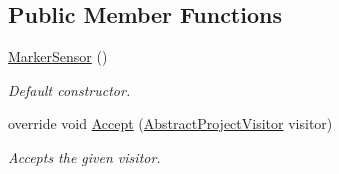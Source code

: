 \subsection*{Public Member Functions}
\begin{DoxyCompactItemize}
\item 
\hyperlink{class_a_rdev_kit_1_1_model_1_1_project_1_1_marker_sensor_a520687ce212f4b28f8e322b41bd64551}{Marker\-Sensor} ()
\begin{DoxyCompactList}\small\item\em Default constructor. \end{DoxyCompactList}\item 
override void \hyperlink{class_a_rdev_kit_1_1_model_1_1_project_1_1_marker_sensor_a21f889bd4916cb1ee7f455a9f644b72a}{Accept} (\hyperlink{class_a_rdev_kit_1_1_controller_1_1_project_controller_1_1_abstract_project_visitor}{Abstract\-Project\-Visitor} visitor)
\begin{DoxyCompactList}\small\item\em Accepts the given visitor. \end{DoxyCompactList}\end{DoxyCompactItemize}
